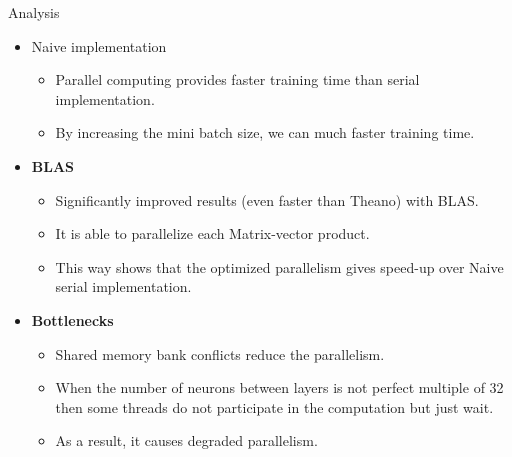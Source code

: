  
 \begin{frame}{Analysis}
 	\begin{itemize}
 	\item {Naive implementation}
 	\begin{itemize}
 	\item {Parallel computing provides faster training time than serial implementation.}
 	\item {By increasing the mini batch size, we can much faster training time.}
 	\end{itemize}
 	\item {\textbf{BLAS}}
 	\begin{itemize}
 	\item {Significantly improved results (even faster than Theano) with BLAS.}
 	\item {It is able to parallelize each Matrix-vector product.}
 	\item { This way shows that the optimized parallelism gives speed-up over Naive serial implementation.}
	\end{itemize}
	\item {\textbf{Bottlenecks}}
	\begin{itemize}
	\item {Shared memory bank conflicts reduce the parallelism.}
	\item {When the number of neurons between layers is not perfect multiple of 32 then some threads do not participate in the computation but just wait.}
	\item {As a result, it causes degraded parallelism.}
	\end{itemize}
 	\end{itemize}
 
 \end{frame}



